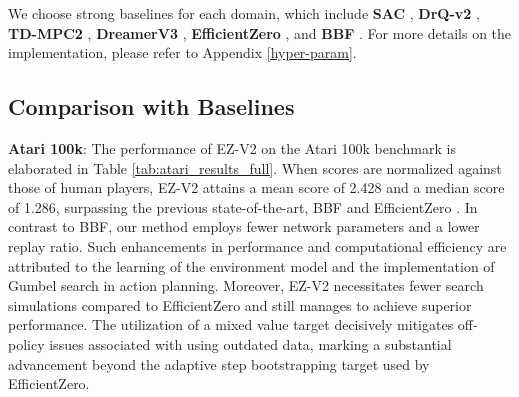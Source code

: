 We choose strong baselines for each domain, which include \textbf{SAC} \citep{haarnoja2018soft}, \textbf{DrQ-v2} \citep{yarats2021mastering}, \textbf{TD-MPC2} \citep{Anonymous2023TDMPC2}, \textbf{DreamerV3} \citep{hafner2023mastering}, \textbf{EfficientZero} \citep{ye2021mastering}, and \textbf{BBF} \citep{schwarzer2023bigger}. For more details on the implementation, please refer to Appendix \ref{hyper-param}.




\subsection{Comparison with Baselines}

\textbf{Atari 100k}: The performance of EZ-V2 on the Atari 100k benchmark is elaborated in Table \ref{tab:atari_results_full}. When scores are normalized against those of human players, EZ-V2 attains a mean score of 2.428 and a median score of 1.286, surpassing the previous state-of-the-art, BBF \citep{schwarzer2023bigger} and EfficientZero \citep{ye2021mastering}. 
In contrast to BBF, our method employs fewer network parameters and a lower replay ratio.
Such enhancements in performance and computational efficiency are attributed to the learning of the environment model and the implementation of Gumbel search in action planning.
Moreover, EZ-V2 necessitates fewer search simulations compared to EfficientZero and still manages to achieve superior performance.
The utilization of a mixed value target decisively mitigates off-policy issues associated with using outdated data, marking a substantial advancement beyond the adaptive step bootstrapping target used by EfficientZero.




